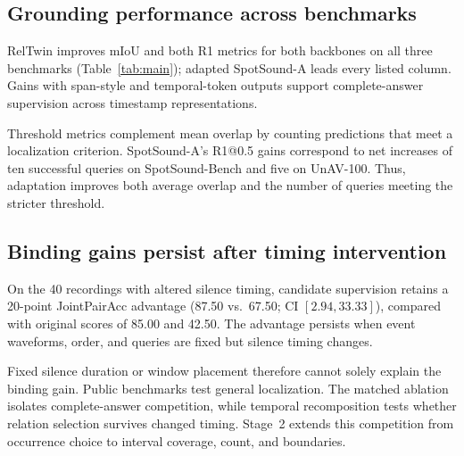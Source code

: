 \subsection{Grounding performance across benchmarks}
RelTwin improves mIoU and both R1 metrics for both backbones on all three benchmarks (Table~\ref{tab:main}); adapted SpotSound-A leads every listed column. Gains with span-style and temporal-token outputs support complete-answer supervision across timestamp representations.

Threshold metrics complement mean overlap by counting predictions that meet a localization criterion. SpotSound-A's R1@0.5 gains correspond to net increases of ten successful queries on SpotSound-Bench and five on UnAV-100. Thus, adaptation improves both average overlap and the number of queries meeting the stricter threshold.



\subsection{Binding gains persist after timing intervention}
\label{sec:timing}
On the 40 recordings with altered silence timing, candidate supervision retains a 20-point JointPairAcc advantage (87.50 vs.\ 67.50; CI $[2.94,33.33]$), compared with original scores of 85.00 and 42.50. The advantage persists when event waveforms, order, and queries are fixed but silence timing changes.

Fixed silence duration or window placement therefore cannot solely explain the binding gain. Public benchmarks test general localization. The matched ablation isolates complete-answer competition, while temporal recomposition tests whether relation selection survives changed timing. Stage~2 extends this competition from occurrence choice to interval coverage, count, and boundaries.
